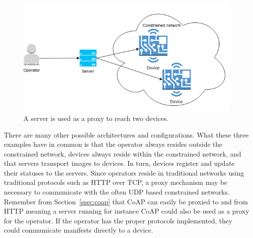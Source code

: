 \documentclass[0-thesis.tex]{subfiles}
\begin{document}
\begin{figure}
    \caption{A server is used as a proxy to reach two devices.}
    \label{fig:operator-server}
    \includegraphics[scale=0.8]{images/operator-server.png}
\end{figure}

There are many other possible architectures and configurations. What these three examples
have in common is that the operator always resides outside the constrained network,
devices always reside within the constrained network, and that servers transport images to
devices. In turn, devices register and update their statuses to the servers. Since
operators reside in traditional networks using traditional protocols such as HTTP over
TCP, a proxy mechanism may be necessary to communicate with the often UDP based
constrained networks. Remember from Section~\ref{ssec:coap} that CoAP can easily be
proxied to and from HTTP meaning a server running for instance CoAP could also be used as
a proxy for the operator. If the operator has the proper protocols implemented, they could
communicate manifests directly to a device.
\end{document}
